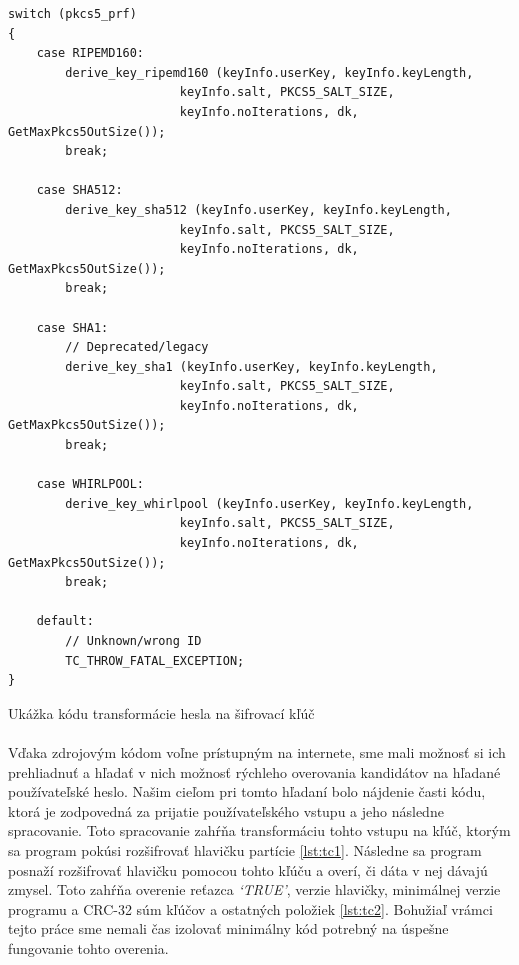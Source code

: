\begin{listing}
\begin{verbatim}
switch (pkcs5_prf)
{
	case RIPEMD160:
		derive_key_ripemd160 (keyInfo.userKey, keyInfo.keyLength,
						keyInfo.salt, PKCS5_SALT_SIZE,
						keyInfo.noIterations, dk, GetMaxPkcs5OutSize());
		break;

	case SHA512:
		derive_key_sha512 (keyInfo.userKey, keyInfo.keyLength, 
						keyInfo.salt, PKCS5_SALT_SIZE, 
						keyInfo.noIterations, dk, GetMaxPkcs5OutSize());
		break;

	case SHA1:
		// Deprecated/legacy
		derive_key_sha1 (keyInfo.userKey, keyInfo.keyLength,
						keyInfo.salt, PKCS5_SALT_SIZE, 
						keyInfo.noIterations, dk, GetMaxPkcs5OutSize());
		break;

	case WHIRLPOOL:
		derive_key_whirlpool (keyInfo.userKey, keyInfo.keyLength, 
						keyInfo.salt, PKCS5_SALT_SIZE, 
						keyInfo.noIterations, dk, GetMaxPkcs5OutSize());
		break;

	default:		
		// Unknown/wrong ID
		TC_THROW_FATAL_EXCEPTION;
}
\end{verbatim}
\caption{Ukážka kódu transformácie hesla na šifrovací kľúč}
\label{lst:tc1}
\end{listing}

\paragraph{}
Vďaka zdrojovým kódom voľne prístupným na internete, sme mali možnosť si ich prehliadnuť a hľadať v nich možnosť rýchleho overovania kandidátov na hľadané používateľské heslo. Našim cieľom pri tomto hľadaní bolo nájdenie časti kódu, ktorá je zodpovedná za prijatie používateľského vstupu a jeho následne spracovanie. Toto spracovanie zahŕňa transformáciu tohto vstupu na kľúč, ktorým sa program pokúsi rozšifrovať hlavičku partície \ref{lst:tc1}. Následne sa program posnaží rozšifrovať hlavičku pomocou tohto kľúču a overí, či dáta v nej dávajú zmysel. Toto zahŕňa overenie reťazca \emph{`TRUE'}, verzie hlavičky, minimálnej verzie programu a CRC-32 súm kľúčov a ostatných položiek \ref{lst:tc2}. Bohužiaľ vrámci tejto práce sme nemali čas izolovať minimálny kód potrebný na úspešne fungovanie tohto overenia.

